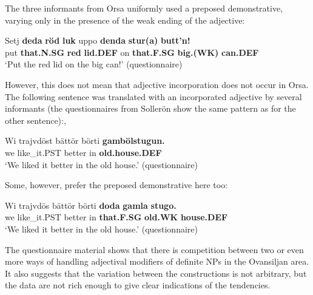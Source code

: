 The three informants from Orsa uniformly used a preposed demonstrative, varying only in the presence of the weak ending of the adjective: 


\ea\label{}
\gll Setj  \textbf{deda} \textbf{röd} \textbf{luk} uppo  \textbf{denda} \textbf{stur(a)} \textbf{butt’n!}\\
put  \textbf{that.N.SG} \textbf{red} \textbf{lid.DEF} on  \textbf{that.F.SG} \textbf{big.(WK)} \textbf{can.DEF}\\
\glt ‘Put the red lid on the big can!’ (questionnaire)
\z

However, this does not mean that adjective incorporation does not occur in Orsa. The following sentence was translated with an incorporated adjective by several informants (the questionnaires from Sollerön show the same pattern as for the other sentence):,


\ea\label{}
\gll Wi  trajvdöst  bättör  börti  \textbf{gambölstugun.}\\
we  like\_it.PST  better  in  \textbf{old.house.DEF}\\
\glt ‘We liked it better in the old house.’ (questionnaire)
\z

Some, however, prefer the preposed demonstrative here too:


\ea\label{}
\gll Wi  trajvdös  bättör  börti  \textbf{doda} \textbf{gamla} \textbf{stugo.}\\
we  like\_it.PST  better  in  \textbf{that.F.SG} \textbf{old.WK} \textbf{house.DEF}\\
\glt ‘We liked it better in the old house.’ (questionnaire)
\z

The questionnaire material shows that there is competition between two or even more ways of handling adjectival modifiers of definite NPs in the Ovansiljan area. It also suggests that the variation between the constructions is not arbitrary, but the data are not rich enough to give clear indications of the tendencies. 

